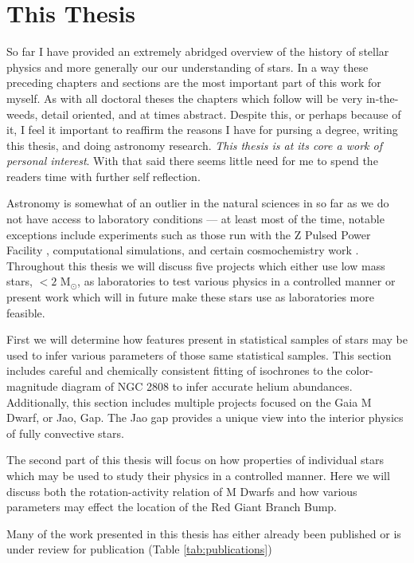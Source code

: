 \section{This Thesis}
So far I have provided an extremely abridged overview of the history of stellar
physics and more generally our our understanding of stars. In a way these
preceding chapters and sections are the most important part of this work for
myself. As with all doctoral theses the chapters which follow will be very
in-the-weeds, detail oriented, and at times abstract. Despite this, or perhaps
because of it, I feel it important to reaffirm the reasons I have for pursing a
degree, writing this thesis, and doing astronomy research. {\em This thesis is
at its core a work of personal interest}. With that said there seems little
need for me to spend the readers time with further self reflection.

Astronomy is somewhat of an outlier in the natural sciences in so far as we do
not have access to laboratory conditions --- at least most of the time, notable
exceptions include experiments such as those run with the Z Pulsed Power
Facility \citep[e.g.][]{Falcon2013}, computational simulations, and certain
cosmochemistry work \citep[e.g.][]{MacPherson2011}. Throughout this thesis we
will discuss five projects which either use low mass stars, $< 2$ M$_{\odot}$, as
laboratories to test various physics in a controlled manner or present work
which will in future make these stars use as laboratories more feasible.

First we will determine how features present in statistical samples of stars may be used
to infer various parameters of those same statistical samples. This section
includes careful and chemically consistent fitting of isochrones to the
color-magnitude diagram of NGC 2808 to infer accurate helium abundances.
Additionally, this section includes multiple projects focused on the Gaia M
Dwarf, or Jao, Gap. The Jao gap provides a unique view into the interior
physics of fully convective stars.

The second part of this thesis will focus on how properties of individual stars
which may be used to study their physics in a controlled manner. Here we will
discuss both the rotation-activity relation of M Dwarfs and how various
parameters may effect the location of the Red Giant Branch Bump. 

Many of the work presented in this thesis has either already been published 
or is under review for publication (Table \ref{tab:publications}) 

